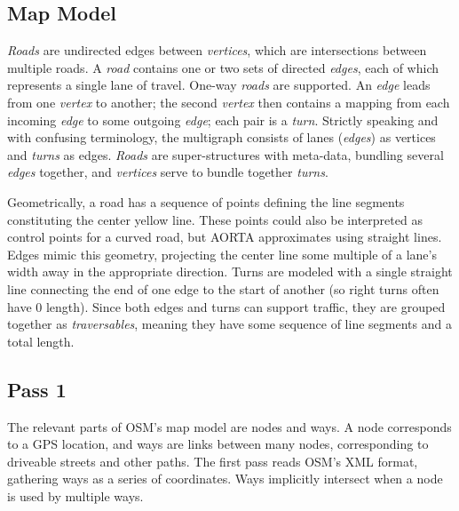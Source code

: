 \documentclass[letterpaper, 10 pt, conference]{ieeeconf}  %
\begin{document}
\subsection{Map Model}



\emph{Roads} are undirected edges between \emph{vertices}, which are
intersections between multiple roads. A \emph{road} contains one or two sets of
directed \emph{edges}, each of which represents a single lane of travel. One-way
\emph{roads} are supported. An \emph{edge} leads from one \emph{vertex} to
another; the second \emph{vertex} then contains a mapping from each incoming
\emph{edge} to some outgoing \emph{edge}; each pair is a \emph{turn}. Strictly
speaking and with confusing terminology, the multigraph consists of lanes
(\emph{edges}) as vertices and \emph{turns} as edges. \emph{Roads} are
super-structures with meta-data, bundling several \emph{edges} together, and
\emph{vertices} serve to bundle together \emph{turns}.

Geometrically, a road has a sequence of points defining the line segments
constituting the center yellow line. These points could also be interpreted as
control points for a curved road, but AORTA approximates using straight lines.
Edges mimic this geometry, projecting the center line some multiple of a lane's
width away in the appropriate direction. Turns are modeled with a single
straight line connecting the end of one edge to the start of another (so right
turns often have $0$ length). Since both edges and turns can support traffic,
they are grouped together as \emph{traversables}, meaning they have some
sequence of line segments and a total length.

\subsection{Pass 1}

The relevant parts of OSM's map model are nodes and ways. A node corresponds to
a GPS location, and ways are links between many nodes, corresponding to
driveable streets and other paths. The first pass reads OSM's XML format,
gathering ways as a series of coordinates. Ways implicitly intersect when a node
is used by multiple ways.
\end{document}
